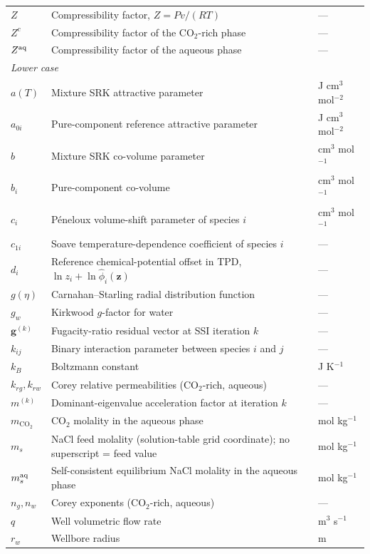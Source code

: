 \documentclass[preprint,12pt,number]{elsarticle}
\begin{document}
\begin{longtable}{@{}p{}p{}p{}@{}}
  $Z$ & Compressibility factor, $Z = Pv/(RT)$ & --- \\
  $Z^c$ & Compressibility factor of the CO$_2$-rich phase & --- \\
  $Z^{\rm aq}$ & Compressibility factor of the aqueous phase & --- \\[4pt]
  \multicolumn{3}{l}{\textit{Lower case}} \\[2pt]
  $a(T)$ & Mixture SRK attractive parameter & J cm$^3$ mol$^{-2}$ \\
  $a_{0i}$ & Pure-component reference attractive parameter & J cm$^3$ mol$^{-2}$ \\
  $b$ & Mixture SRK co-volume parameter & cm$^3$ mol$^{-1}$ \\
  $b_i$ & Pure-component co-volume & cm$^3$ mol$^{-1}$ \\
  $c_i$ & Péneloux volume-shift parameter of species $i$ & cm$^3$ mol$^{-1}$ \\
  $c_{1i}$ & Soave temperature-dependence coefficient of species $i$ & --- \\
  $d_i$ & Reference chemical-potential offset in TPD, $\ln z_i + \ln\hat{\phi}_i(\mathbf{z})$ & --- \\
  $g(\eta)$ & Carnahan--Starling radial distribution function & --- \\
  $g_w$ & Kirkwood $g$-factor for water & --- \\
  $\mathbf{g}^{(k)}$ & Fugacity-ratio residual vector at SSI iteration $k$ & --- \\
  $k_{ij}$ & Binary interaction parameter between species $i$ and $j$ & --- \\
  $k_B$ & Boltzmann constant & J K$^{-1}$ \\
  $k_{rg}, k_{rw}$ & Corey relative permeabilities (CO$_2$-rich, aqueous) & --- \\
  $m^{(k)}$ & Dominant-eigenvalue acceleration factor at iteration $k$ & --- \\
  $m_{\text{CO}_2}$ & CO$_2$ molality in the aqueous phase & mol kg$^{-1}$ \\
  $m_s$ & NaCl feed molality (solution-table grid coordinate); no superscript = feed value & mol kg$^{-1}$ \\
  $m_s^{\rm aq}$ & Self-consistent equilibrium NaCl molality in the aqueous phase & mol kg$^{-1}$ \\
  $n_g, n_w$ & Corey exponents (CO$_2$-rich, aqueous) & --- \\
  $q$ & Well volumetric flow rate & m$^3$ s$^{-1}$ \\
  $r_w$ & Wellbore radius & m \\

\end{longtable}
\end{document}
